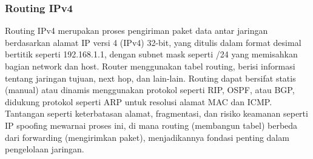 \subsubsection{Routing IPv4}
Routing IPv4 merupakan proses pengiriman paket data antar jaringan berdasarkan alamat IP versi 4 (IPv4) 32-bit, yang ditulis dalam format desimal bertitik seperti 192.168.1.1, dengan subnet mask seperti /24 yang memisahkan bagian network dan host. Router menggunakan tabel routing, berisi informasi tentang jaringan tujuan, next hop, dan lain-lain. Routing dapat bersifat statis (manual) atau dinamis menggunakan protokol seperti RIP, OSPF, atau BGP, didukung protokol seperti ARP untuk resolusi alamat MAC dan ICMP. Tantangan seperti keterbatasan alamat, fragmentasi, dan risiko keamanan seperti IP spoofing mewarnai proses ini, di mana routing (membangun tabel) berbeda dari forwarding (mengirimkan paket), menjadikannya fondasi penting dalam pengelolaan jaringan.
